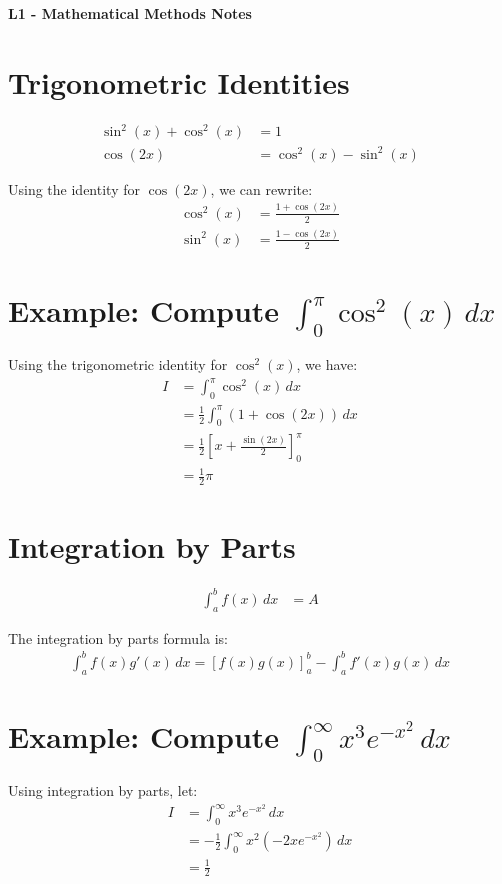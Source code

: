 \documentclass[a4paper,12pt]{article}
\begin{document}
\begin{center}
    \textbf{\large L1 - Mathematical Methods Notes}
\end{center}

\vspace{0.2cm}

\begin{multicols}{2}

\section*{Trigonometric Identities}
\begin{align*}
    \sin^2(x) + \cos^2(x) &= 1 \\
    \cos(2x) &= \cos^2(x) - \sin^2(x)
\end{align*}

Using the identity for $\cos(2x)$, we can rewrite:
\begin{align*}
    \cos^2(x) &= \frac{1 + \cos(2x)}{2} \\
    \sin^2(x) &= \frac{1 - \cos(2x)}{2}
\end{align*}

\section*{Example: Compute $\int_0^{\pi} \cos^2(x) \, dx$}
Using the trigonometric identity for $\cos^2(x)$, we have:
\begin{align*}
    I &= \int_0^{\pi} \cos^2(x) \, dx \\
      &= \frac{1}{2} \int_0^{\pi} \left( 1 + \cos(2x) \right) \, dx \\
      &= \frac{1}{2} \left[ x + \frac{\sin(2x)}{2} \right]_0^{\pi} \\
      &= \frac{1}{2} \pi
\end{align*}

\section*{Integration by Parts}
\begin{align*}
    \int_a^b f(x) \, dx &= A
\end{align*}

The integration by parts formula is:
\begin{align*}
    \int_a^b f(x) g'(x) \, dx = \left[ f(x) g(x) \right]_a^b - \int_a^b f'(x) g(x) \, dx
\end{align*}

\section*{Example: Compute $\int_0^{\infty} x^3 e^{-x^2} \, dx$}
Using integration by parts, let:
\begin{align*}
    I &= \int_0^{\infty} x^3 e^{-x^2} \, dx \\
      &= -\frac{1}{2} \int_0^{\infty} x^2 (-2x e^{-x^2}) \, dx \\
      &= \frac{1}{2}
\end{align*}


\end{multicols}
\end{document}
